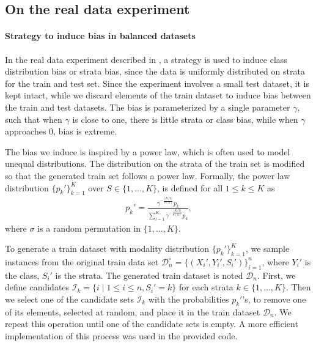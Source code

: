 \documentclass[12pt]{article}
\begin{document}
\subsection*{On the real data experiment}\label{sec:generalities_expes}



\paragraph{Strategy to induce bias in balanced datasets}

In the real data experiment described in ,
a strategy is used to induce class distribution bias or
strata bias, since the data is uniformly distributed on strata for the train and test set.
Since the experiment involves a small test dataset, it is kept
intact, while we discard elements of the train dataset to induce bias between
the train and test datasets. The bias is parameterized by a single parameter
$\gamma$, such that when $\gamma$ is close to one, there is little strata or
class bias, while when $\gamma$ approaches $0$, bias is extreme.

The bias we induce is inspired by a power law, which is often used
to model unequal distributions. 
The distribution on the strata of the train set is modified so that the
generated train set follows a power law.
Formally, the power law distribution $\{p_k'\}_{k=1}^K$ over $S\in\{ 1, \dots, K\}$,
is defined for all $1 \le k \le K$ as
\begin{align*}
    p_k' = \frac{\gamma^{- \frac{\lfloor K/2 \rfloor}{\sigma(k)}} p_k}{ 
    \sum_{l=1}^K \gamma^{- \frac{\lfloor K/2 \rfloor}{\sigma(k)}} p_k },
\end{align*}
where $\sigma$ is a random permutation in $\{1,\dots,K\}$.

To generate a train dataset with modality distribution $\{p_k'\}_{k=1}^K$,
we sample instances from the original train data set $\mathcal{D}_n^\circ=
\{ (X_i', Y_i', S_i') \}_{i=1}^n$, where $Y_i'$ is the class, $S_i'$ is the
strata. The generated train dataset is noted $\mathcal{D}_n$. First, we define
candidates $\mathcal{I}_k = \{ i \mid 1 \le i \le n, S_i' = k \}$ for each
strata $k \in \{1, \dots, K\}$.
Then we select one of the candidate sets $\mathcal{I}_k$ with the probabilities
$p_k'$'s, to remove one of its elements, selected at random, and place it in the
train dataset $\mathcal{D}_n$. We repeat this operation until one of the
candidate sets is empty. A more efficient implementation of this process was used in the
provided code.
\end{document}
